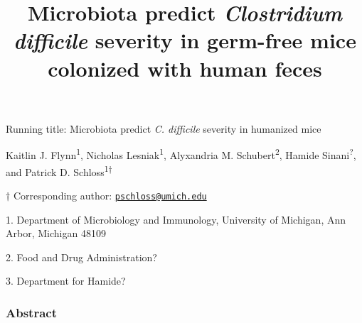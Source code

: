 \documentclass[11pt,]{article}
\title{\textbf{Microbiota predict \emph{Clostridium difficile} severity in
germ-free mice colonized with human feces}}
\author{}
\date{}
\begin{document}
\maketitle


\vspace{35mm}

Running title: Microbiota predict \emph{C. difficile} severity in
humanized mice

\vspace{35mm}

Kaitlin J. Flynn\textsuperscript{1}, Nicholas
Lesniak\textsuperscript{1}, Alyxandria M. Schubert\textsuperscript{2},
Hamide Sinani\textsuperscript{?}, and Patrick D.
Schloss\textsuperscript{1\(\dagger\)}

\vspace{40mm}

\(\dagger\) Corresponding author:
\href{mailto:pschloss@umich.edu}{\nolinkurl{pschloss@umich.edu}}

1. Department of Microbiology and Immunology, University of Michigan,
Ann Arbor, Michigan 48109

2. Food and Drug Administration?

3. Department for Hamide?

\newpage
\linenumbers

\subsubsection{Abstract}\label{abstract}
\end{document}
